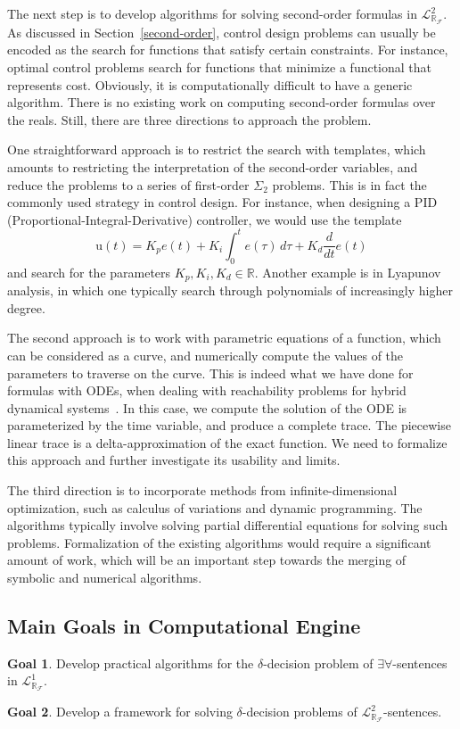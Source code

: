 \documentclass[11pt]{article}
\newcommand{\lrf}{\mathcal{L}_{\mathbb{R}_{\mathcal{F}}}}
\theoremstyle{definition}
\newtheorem{goal}{Goal}
\begin{document}
The next step is to develop algorithms for solving second-order formulas in $\lrf^2$. As discussed in Section~\ref{second-order}, control design problems can usually be encoded as the search for functions that satisfy certain constraints. For instance, optimal control problems search for functions that minimize a functional that represents cost. Obviously, it is computationally difficult to have a generic algorithm. There is no existing work on computing second-order formulas over the reals. Still, there are three directions to approach the problem. 

One straightforward approach is to restrict the search with templates, which amounts to restricting the interpretation of the second-order variables, and reduce the problems to a series of first-order $\Sigma_2$ problems. This is in fact the commonly used strategy in control design. For instance, when designing a PID (Proportional-Integral-Derivative) controller, we would use the template 
$$\mathrm{u}(t)= K_p{e(t)} + K_{i}\int_{0}^{t}{e(\tau)}\,{d\tau} + K_{d}\frac{d}{dt}e(t)$$
and search for the parameters $K_p, K_i, K_d\in \mathbb{R}$. Another example is in Lyapunov analysis, in which one typically search through polynomials of increasingly higher degree. 

The second approach is to work with parametric equations of a function, which can be considered as a curve, and numerically compute the values of the parameters to traverse on the curve. This is indeed what we have done for formulas with ODEs, when dealing with reachability problems for hybrid dynamical systems~\cite{DBLP:conf/fmcad/GaoKC13}. In this case, we compute the solution of the ODE is parameterized by the time variable, and produce a complete trace. The piecewise linear trace is a delta-approximation of the exact function. We need to formalize this approach and further investigate its usability and limits. 

The third direction is to incorporate methods from infinite-dimensional optimization, such as calculus of variations and dynamic programming. The algorithms typically involve solving partial differential equations for solving such problems. Formalization of the existing algorithms would require a significant amount of work, which will be an important step towards the merging of symbolic and numerical algorithms. 

\subsection{Main Goals in Computational Engine}
\begin{goal}
Develop practical algorithms for the $\delta$-decision problem of $\exists\forall$-sentences in $\lrf^1$.
\end{goal}
\begin{goal}
Develop a framework for solving $\delta$-decision problems of $\lrf^2$-sentences.
\end{goal}
\end{document}
